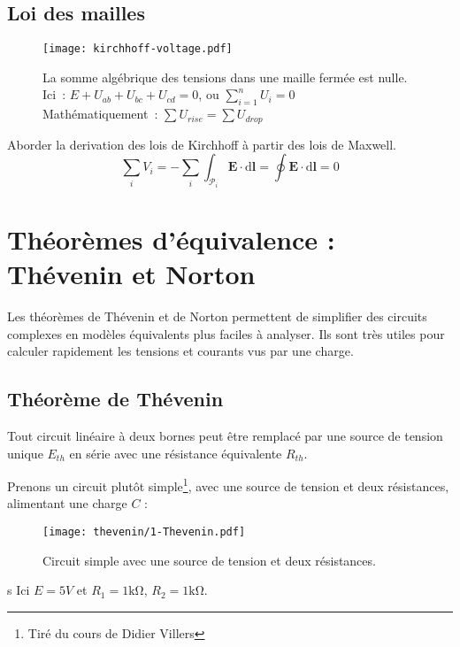 \subsection{Loi des mailles} \label{subsec:mailles}
\begin{figure}[H]
    \centering
    \texttt{[image: kirchhoff-voltage.pdf]}
    \caption[Loi des mailles.]{
        La somme alg\'ebrique des tensions dans une maille ferm\'ee est nulle.\\
        Ici~: \(E+U_{ab}+U_{bc}+U_{cd}=0\), ou \(\displaystyle\sum_{i=1}^nU_i=0\)\\
        \vspace{\baselineskip}
        Math\'ematiquement~: \(\displaystyle\sum U_{rise} = \displaystyle\sum U_{drop}\)
    }
    \label{fig:kirchhoff-voltage}%
\end{figure}
\begin{Todo}
	Aborder la derivation des lois de Kirchhoff \`a partir des lois de Maxwell.
	\[\sum_i V_i = - \sum_i \int_{\mathcal{P}_i}\mathbf{E}\cdot\mathrm{d}\mathbf{l} = \oint\mathbf{E}\cdot\mathrm{d}\mathbf{l} = 0\]
\end{Todo}

\section{Th\'eor\`emes d'\'equivalence : Th\'evenin et Norton} \label{subsec:thevenin_norton}

Les th\'eor\`emes de Th\'evenin et de Norton permettent de simplifier des circuits
complexes en mod\`eles \'equivalents plus faciles à analyser. Ils sont tr\`es utiles
pour calculer rapidement les tensions et courants vus par une charge.

\subsection{Th\'eor\`eme de Th\'evenin}

Tout circuit lin\'eaire à deux bornes peut \^etre remplac\'e par une source de tension
unique \(E_{th}\) en s\'erie avec une r\'esistance \'equivalente \(R_{th}\).

Prenons un circuit plut\^ot simple\footnote{Tir\'e du cours de Didier Villers},
avec une source de tension et deux r\'esistances, alimentant une charge \(C\) :

\begin{figure}[H]
    \centering
    \texttt{[image: thevenin/1-Thevenin.pdf]}
    \caption{Circuit simple avec une source de tension et deux r\'esistances.}
\end{figure}s
Ici \(E=5V\) et \(R_1=1\unit{\kilo\ohm}\), \(R_2=1\unit{\kilo\ohm}\).\\

